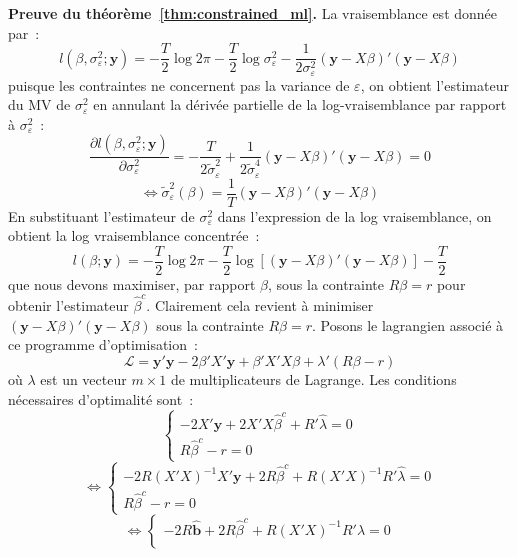 \documentclass[10pt]{beamer}
\begin{document}
\begin{notes}

  \textbf{Preuve du théorème~\ref{thm:constrained_ml}.} La vraisemblance est donnée par~:
  \[
    l\left( \beta, \sigma_{\varepsilon}^2; \mathbf y \right) = -\frac{T}{2}\log 2\pi - \frac{T}{2} \log\sigma_{\varepsilon}^2 - \frac{1}{2\sigma_{\varepsilon}^2}\left( \mathbf y - X\beta \right)'\left( \mathbf y - X\beta \right)
  \]
  puisque les contraintes ne concernent pas la variance de $\varepsilon$, on obtient l'estimateur du MV de $\sigma_{\varepsilon}^2$ en annulant la dérivée partielle de la log-vraisemblance par rapport à $\sigma_{\varepsilon}^2$~:
  \[
    \frac{\partial l\left( \beta, \sigma_{\varepsilon}^2; \mathbf y \right)}{\partial \sigma_{\varepsilon}^2} = -\frac{T}{2\tilde\sigma_{\varepsilon}^2} + \frac{1}{2\tilde\sigma_{\varepsilon}^4}\left(\mathbf y - X\beta \right)'\left(\mathbf y - X\beta\right) = 0
  \]
  \[
    \Leftrightarrow \tilde \sigma_{\varepsilon}^2(\beta) = \frac{1}{T}\left(\mathbf y - X\beta \right)'\left(\mathbf y - X\beta  \right)
  \]
  En substituant l'estimateur de $\sigma_{\varepsilon}^2$ dans l'expression de la log vraisemblance, on obtient la log vraisemblance concentrée~:
  \[
    l\left( \beta ; \mathbf y \right) = -\frac{T}{2}\log 2\pi - \frac{T}{2}\log\left[\left(\mathbf y - X\beta \right)'\left(\mathbf y - X\beta  \right)\right] - \frac{T}{2}
  \]
  que nous devons maximiser, par rapport $\beta$, sous la contrainte $R\beta=r$ pour obtenir l'estimateur $\hat\beta^c$. Clairement cela revient à minimiser $\left(\mathbf y - X\beta \right)'\left(\mathbf y - X\beta  \right)$ sous la contrainte $R\beta=r$. Posons le lagrangien associé à ce programme d'optimisation~:
  \[
    \mathcal L = \mathbf y'\mathbf y - 2\beta'X'\mathbf y + \beta'X'X\beta + \lambda'\left( R\beta-r\right)
  \]
  où $\lambda$ est un vecteur $m\times 1$ de multiplicateurs de Lagrange. Les conditions nécessaires d'optimalité sont~:
  \[
    \begin{cases}
      -2X'\mathbf y + 2X'X\hat\beta^c + R'\hat\lambda = 0\\
      R\hat\beta^c -r = 0
    \end{cases}
  \]
\[
    \Leftrightarrow\begin{cases}
      -2R(X'X)^{-1}X'\mathbf y + 2R\hat\beta^c + R(X'X)^{-1}R'\hat\lambda = 0\\
      R\hat\beta^c -r = 0
    \end{cases}
  \]
  \[
    \Leftrightarrow\begin{cases}
      -2R\hat{\mathbf b} + 2R\hat\beta^c + R(X'X)^{-1}R'\hat\lambda = 0\\

\end{cases}\]
\end{notes}
\end{document}
